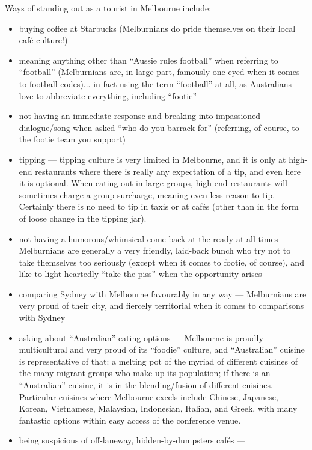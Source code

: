 Ways of standing out as a tourist in Melbourne include:
\begin{itemize}
\item buying coffee at Starbucks (Melburnians do pride themselves on
  their local caf\'e culture!)
\item meaning anything other than ``Aussie rules football'' when
  referring to ``football'' (Melburnians are, in large part, famously
  one-eyed when it comes to football codes)... in fact using the term
  ``football'' at all, as Australians love to abbreviate everything,
  including ``footie''
\item not having an immediate response and breaking into impassioned
  dialogue/song when asked ``who do you barrack for'' (referring, of
  course, to the footie team you support)
\item tipping --- tipping culture is very limited in Melbourne, and it
  is only at high-end restaurants where there is really any expectation
  of a tip, and even here it is optional. When eating out in large
  groups, high-end restaurants will sometimes charge a group surcharge,
  meaning even less reason to tip. Certainly there is no need to tip in
  taxis or at caf\'es (other than in the form of loose change in the
  tipping jar).
\item not having a humorous/whimsical come-back at the ready at all
  times --- Melburnians are generally a very friendly, laid-back bunch
  who try not to take themselves too seriously (except when it comes to
  footie, of course), and like to light-heartedly ``take the piss'' when
  the opportunity arises
\item comparing Sydney with Melbourne favourably in any way ---
  Melburnians are very proud of their city, and fiercely territorial
  when it comes to comparisons with Sydney
\item asking about ``Australian'' eating options --- Melbourne is
  proudly multicultural and very proud of its ``foodie'' culture, and
  ``Australian'' cuisine is representative of that: a melting pot of the
  myriad of different cuisines of the many migrant groups who make up
  its population; if there is an ``Australian'' cuisine, it is in the
  blending/fusion of different cuisines. Particular cuisines where
  Melbourne excels include Chinese, Japanese, Korean, Vietnamese,
  Malaysian, Indonesian, Italian, and Greek, with many fantastic options
  within easy access of the conference venue.
\item being suspicious of off-laneway, hidden-by-dumpsters caf\'es ---

\end{itemize}
